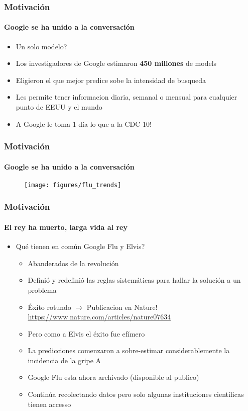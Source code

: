 \documentclass[
  shownotes,
  xcolor={svgnames},
  hyperref={colorlinks,citecolor=DarkBlue,linkcolor=DarkRed,urlcolor=DarkBlue}
  ]{beamer}
\begin{document}
\begin{frame}
\frametitle{Motivación}
\framesubtitle{Google se ha unido a la conversación}

\begin{itemize}
  \item Un solo modelo?
  \bigskip
  \item Los investigadores de Google estimaron {\bf 450 millones} de models
  \bigskip
  \item Eligieron el que mejor predice sobe la intensidad de busqueda
  \bigskip
  \item Les permite tener informacion diaria, semanal o mensual para cualquier punto de EEUU y el mundo
  \bigskip
  \item A Google le toma 1 día lo que a la CDC 10!
\end{itemize}  
\end{frame}




\begin{frame}
\frametitle{Motivación}
\framesubtitle{Google se ha unido a la conversación}
\begin{figure}[H] \centering
            \captionsetup{justification=centering}  
            \texttt{[image: figures/flu\_trends]}
    \end{figure}
\end{frame}



\begin{frame}
\frametitle{Motivación}
\framesubtitle{El rey ha muerto, larga vida al rey}
  \begin{itemize}
    \item Qué tienen en común Google Flu y Elvis?
    \bigskip
    \begin{itemize}
      \item Abanderados de la revolución
      \medskip
      \item Definió y redefinió las reglas sistemáticas para hallar la solución a un problema
      \medskip
      \item Éxito rotundo $\rightarrow$ Publicacion en Nature! \url{https://www.nature.com/articles/nature07634}
      \medskip
      \item Pero como a Elvis el éxito fue efímero
      \medskip
      \item La predicciones comenzaron a sobre-estimar considerablemente la incidencia de la gripe A
      \medskip
      \item Google Flu esta ahora archivado (disponible al publico)
      \medskip
      \item Continúa recolectando datos pero solo algunas instituciones científicas tienen accesso 
    \end{itemize}  
  \end{itemize}  
\end{frame}
\end{document}
